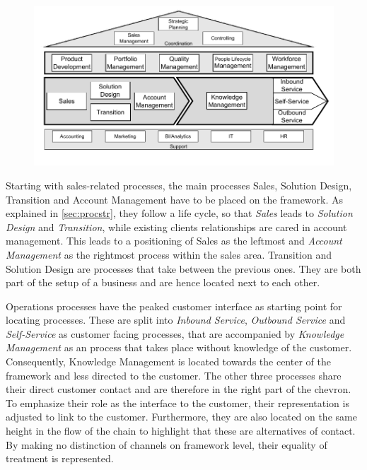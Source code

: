 		\begin{figure}[caption={Framework}, label={fig:framework}]
		{	\includegraphics[width=.9\textwidth]{figures/framework.pdf}}
	\end{figure} 
	
	
	 Starting with sales-related processes, the main processes Sales, Solution Design, Transition and Account Management have to be placed on the framework. As explained in \ref{sec:procstr}, they follow a life cycle, so that \textit{Sales} leads to \textit{Solution Design} and \textit{Transition}, while existing clients relationships are cared in account management. This leads to a positioning of Sales as the leftmost and \textit{Account Management} as the rightmost process within the sales area. Transition and Solution Design are processes that take between the previous ones. They are both part of the setup of a business and are hence located next to each other. 
	 
	 Operations processes have the peaked customer interface as starting point for locating processes. These are split into \textit{Inbound Service}, \textit{Outbound Service} and \textit{Self-Service} as customer facing processes, that are accompanied by \textit{Knowledge Management} as an process that takes place without knowledge of the customer. Consequently, Knowledge Management is located towards the center of the framework and less directed to the customer. The other three processes share their direct customer contact and are therefore in the right part of the chevron. To emphasize their role as the interface to the customer, their representation is adjusted to link to the customer. Furthermore, they are also located on the same height in the flow of the chain to highlight that these are alternatives of contact. By making no distinction of channels on framework level, their equality of treatment is represented. 
	 
